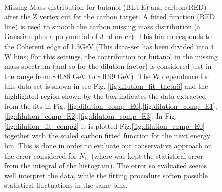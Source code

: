\begin{figure}[H]
  \begin{center}
     \\
    \caption{Missing Mass distribution for butanol (BLUE) and carbon(RED) after the Z vertex cut for the carbon target. A fitted function (RED line)  is used to smooth the carbon missing mass distribution (a Gaussian plus a polynomial of 3-rd order). This bin corresponds to the Coherent edge of 1.3GeV (This data-set has been divided into 4 W bins; For this settings, the contribution for butanol in the missing mass spectrum (and so for the dilution factor) is considered just in the range from $\sim 0.88$ GeV to $\sim 0.99$ GeV). The W dependence for this data set is shown in see Fig. \ref{fig:dilution_fit_theta6} and the highlighted region shown by the box indicates the data extracted from the fits in Fig. \ref{fig:dilution_comp_E0},\ref{fig:dilution_comp_E1},\ref{fig:dilution_comp_E2},\ref{fig:dilution_comp_E3}.
      In Fig. \ref{fig:dilution_fit_comp2} it is plotted Fig.\ref{fig:dilution_comp_E0} together with the scaled carbon fitted function for the next energy bin. This is done in order to evaluate our conservative approach on the error considered for $N_C$ (where was kept the statistical error from the integral of the histogram). The error so evaluated seems well interpret the data, while the fitting procedure soften possible statistical fluctuations in the same bins. }
    \label{fig:dilution_fit_comp}
  \end{center}
\end{figure}

